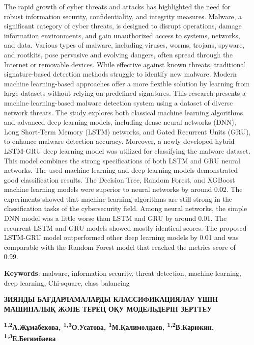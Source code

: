 The rapid growth of cyber threats and attacks has highlighted the need
for robust information security, confidentiality, and integrity
measures. Malware, a significant category of cyber threats, is designed
to disrupt operations, damage information environments, and gain
unauthorized access to systems, networks, and data. Various types of
malware, including viruses, worms, trojans, spyware, and rootkits, pose
pervasive and evolving dangers, often spread through the Internet or
removable devices. While effective against known threats, traditional
signature-based detection methods struggle to identify new malware.
Modern machine learning-based approaches offer a more flexible solution
by learning from large datasets without relying on predefined
signatures. This research presents a machine learning-based malware
detection system using a dataset of diverse network threats. The study
explores both classical machine learning algorithms and advanced deep
learning models, including dense neural networks (DNN), Long Short-Term
Memory (LSTM) networks, and Gated Recurrent Units (GRU), to enhance
malware detection accuracy. Moreover, a newly developed hybrid LSTM-GRU
deep learning model was utilized for classifying the malware dataset.
This model combines the strong specifications of both LSTM and GRU
neural networks. The used machine learning and deep learning models
demonstrated good classification results. The Decision Tree, Random
Forest, and XGBoost machine learning models were superior to neural
networks by around 0.02. The experiments showed that machine learning
algorithms are still strong in the classification tasks of the
cybersecurity field. Among neural networks, the simple DNN model was a
little worse than LSTM and GRU by around 0.01. The recurrent LSTM and
GRU models showed mostly identical scores. The proposed LSTM-GRU model
outperformed other deep learning models by 0.01 and was comparable with
the Random Forest model that reached the metrics score of 0.99.

{\bfseries Keywords}: malware, information security, threat detection,
machine learning, deep learning, Chi-square, class balancing

\begin{articleheader}
{\bfseries ЗИЯНДЫ БАҒДАРЛАМАЛАРДЫ КЛАССИФИКАЦИЯЛАУ ҮШІН МАШИНАЛЫҚ ЖӘНЕ
ТЕРЕҢ ОҚУ МОДЕЛЬДЕРІН ЗЕРТТЕУ}

{\bfseries \textsuperscript{1,2}А.Жұмабекова\textsuperscript{\envelope },
\textsuperscript{1,3}О.Усатова, \textsuperscript{1}М.Қалимолдаев,
\textsuperscript{1,2}В.Карюкин, \textsuperscript{1,3}Е.Бегимбаева}
\end{articleheader}

